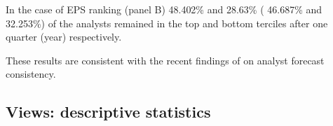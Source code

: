 \documentclass{article}\usepackage[]{graphicx}\usepackage[]{color}
\begin{document}
In the case of EPS ranking  (panel B) 48.402\% and  28.63\% ( 46.687\% and  32.253\%) of the analysts  remained in the top and bottom terciles after one quarter (year)  respectively.

These results are consistent with the recent findings of \cite{hilary2013} on analyst forecast consistency. 






\subsection{Views: descriptive statistics}
\end{document}
